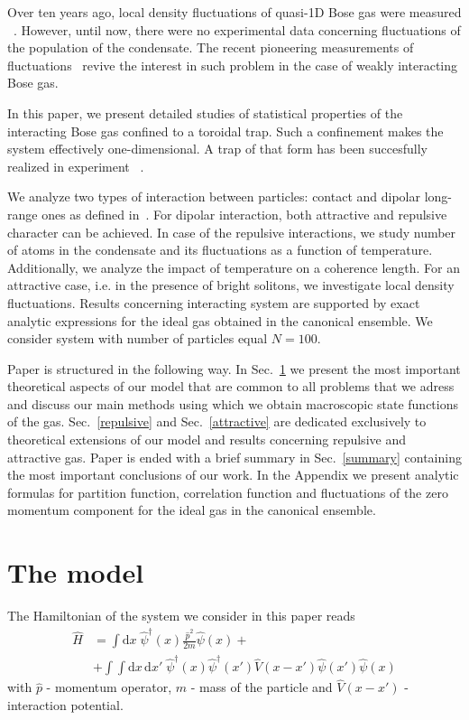 \documentclass[aps,pra,reprint]{revtex4-2}
\begin{document}
Over ten years ago, local density fluctuations of quasi-1D Bose gas were 
measured ~\cite{Esteve2006}. However, until now, there were no experimental 
data concerning fluctuations of the population of the condensate. The recent 
pioneering measurements of fluctuations~\cite{Kristensen2019} revive the 
interest in such problem in the case of weakly interacting Bose gas.
    
In this paper, we present detailed studies of statistical properties of the 
interacting Bose gas confined to a toroidal trap. Such a confinement makes 
the system effectively one-dimensional. A trap of that form has been 
succesfully realized in experiment ~\cite{Ramanathan2011}.
     
We analyze two types of interaction between particles: contact and dipolar 
long-range ones as defined in~\cite{Sinha2007}.
For dipolar interaction, both attractive and repulsive character can be 
achieved. In case of the repulsive interactions, we study number of atoms 
in the condensate and its fluctuations as a function of temperature. 
Additionally, we analyze the impact of temperature on a coherence length. 
For an attractive case, i.e. in the presence of bright solitons, we investigate 
local density fluctuations. Results concerning interacting system are supported 
by exact analytic expressions for the ideal gas obtained in the canonical 
ensemble. We consider system with number of particles equal $N=100$. 
     
Paper is structured in the following way.  In Sec.~\ref{model} we present 
the most important theoretical aspects of our model that are common to all 
problems that we adress and discuss our main methods using which we obtain 
macroscopic state functions of the gas. Sec.~\ref{repulsive} and 
Sec.~\ref{attractive} are dedicated exclusively to theoretical extensions 
of our model and results concerning repulsive and attractive gas. Paper 
is ended with a brief summary in Sec.~\ref{summary} containing the most 
important conclusions of our work. In the Appendix we present analytic formulas 
for partition function, correlation function and fluctuations of the zero 
momentum component for the ideal gas in the canonical ensemble.

\section{The model}\label{model}
The Hamiltonian of the system we consider in this paper reads
\begin{equation}
\label{eq:hamiltonian}
\begin{split}
\hat{H} & = \int \mathrm{d}x \; {\hat{\psi}}^{\dag}(x) \frac{\hat{p}^2}{2m} 
\hat{\psi}(x) + \\
& + \int \int \mathrm{d}x \, \mathrm{d}x' \; {\hat{\psi}}^{\dag}(x) 
{\hat{\psi}}^{\dag}(x') \hat{V}(x-x') \hat{\psi}(x') \hat{\psi}(x)
\end{split}
\end{equation}
with $\hat{p}$ - momentum operator, $m$ - mass of the particle 
and $\hat{V}(x-x')$ - interaction potential.
    
\end{document}
